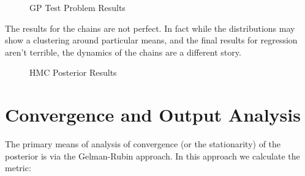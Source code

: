 \documentclass[12pt]{article}
\begin{document}
\vspace{5mm}

\begin{figure}[h]
\centering
{}
\caption{GP Test Problem Results}
\end{figure}

\vspace{5mm}

The results for the chains are not perfect. In fact while the distributions may show a clustering around particular means, and the final results for regression aren't terrible, the dynamics of the chains are a different story.

\begin{figure}[h]
\centering
{}
\caption{HMC Posterior Results}
\end{figure}

\section{Convergence and Output Analysis}

The primary means of analysis of convergence (or the stationarity) of the posterior is via the Gelman-Rubin approach. In this approach we calculate the metric:
\end{document}
